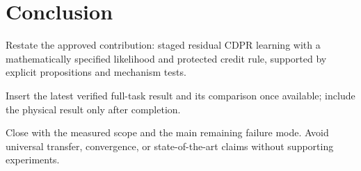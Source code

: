 \section{Conclusion}\label{sec:conclusion}
\begin{outline}
\item Restate the approved contribution: staged residual CDPR learning with a mathematically specified likelihood and protected credit rule, supported by explicit propositions and mechanism tests.
\item Insert the latest verified full-task result and its comparison once available; include the physical result only after completion.
\item Close with the measured scope and the main remaining failure mode. Avoid universal transfer, convergence, or state-of-the-art claims without supporting experiments.
\end{outline}
